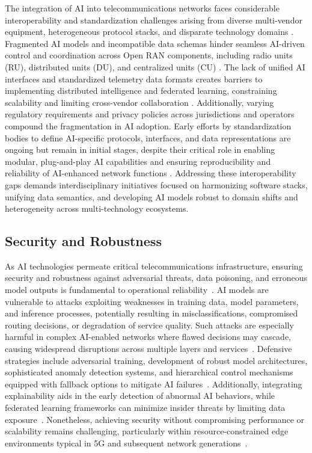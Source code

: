 \documentclass[sigconf]{acmart}
\begin{document}
The integration of AI into telecommunications networks faces considerable interoperability and standardization challenges arising from diverse multi-vendor equipment, heterogeneous protocol stacks, and disparate technology domains \cite{ref48,ref52,ref54}. Fragmented AI models and incompatible data schemas hinder seamless AI-driven control and coordination across Open RAN components, including radio units (RU), distributed units (DU), and centralized units (CU) \cite{ref48}. The lack of unified AI interfaces and standardized telemetry data formats creates barriers to implementing distributed intelligence and federated learning, constraining scalability and limiting cross-vendor collaboration \cite{ref52}. Additionally, varying regulatory requirements and privacy policies across jurisdictions and operators compound the fragmentation in AI adoption. Early efforts by standardization bodies to define AI-specific protocols, interfaces, and data representations are ongoing but remain in initial stages, despite their critical role in enabling modular, plug-and-play AI capabilities and ensuring reproducibility and reliability of AI-enhanced network functions \cite{ref54}. Addressing these interoperability gaps demands interdisciplinary initiatives focused on harmonizing software stacks, unifying data semantics, and developing AI models robust to domain shifts and heterogeneity across multi-technology ecosystems.

\subsection{Security and Robustness}

As AI technologies permeate critical telecommunications infrastructure, ensuring security and robustness against adversarial threats, data poisoning, and erroneous model outputs is fundamental to operational reliability~\cite{ref48,ref50,ref55}. AI models are vulnerable to attacks exploiting weaknesses in training data, model parameters, and inference processes, potentially resulting in misclassifications, compromised routing decisions, or degradation of service quality. Such attacks are especially harmful in complex AI-enabled networks where flawed decisions may cascade, causing widespread disruptions across multiple layers and services~\cite{ref50}. Defensive strategies include adversarial training, development of robust model architectures, sophisticated anomaly detection systems, and hierarchical control mechanisms equipped with fallback options to mitigate AI failures~\cite{ref55}. Additionally, integrating explainability aids in the early detection of abnormal AI behaviors, while federated learning frameworks can minimize insider threats by limiting data exposure~\cite{ref48}. Nonetheless, achieving security without compromising performance or scalability remains challenging, particularly within resource-constrained edge environments typical in 5G and subsequent network generations~\cite{ref55}.
\end{document}
